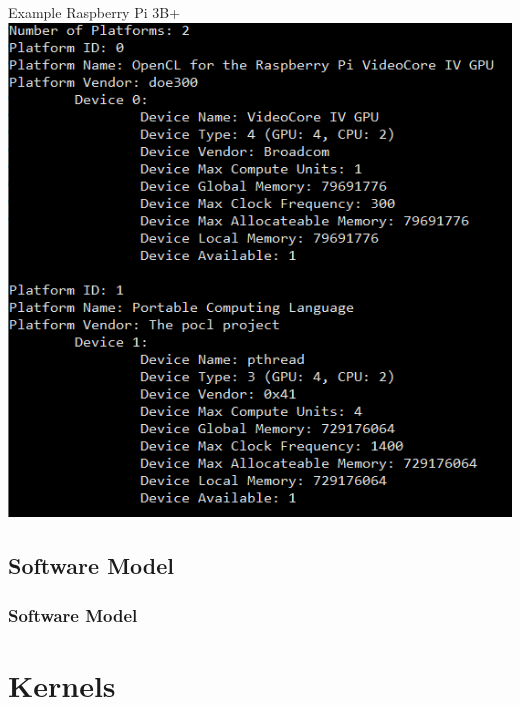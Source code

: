 \documentclass{beamer}
\begin{document}
\begin{frame}{Example Raspberry Pi 3B+}
    \includegraphics[height=.8\textheight]{res/RaspberryPiData.PNG}
\end{frame}
\subsection{Software Model}
\begin{frame}
    \frametitle{Software Model}
\end{frame}

\section{Kernels}
\end{document}
